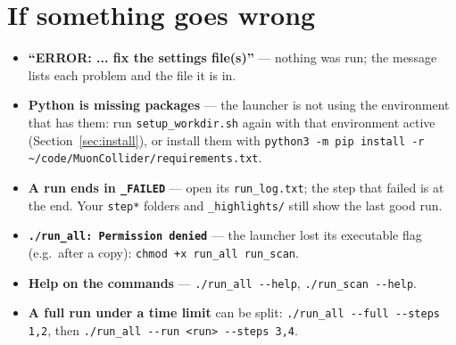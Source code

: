 \documentclass[11pt,letterpaper]{article}
\newcommand{\code}[1]{\texttt{#1}}
\begin{document}
\section{If something goes wrong}
\begin{itemize}[leftmargin=1.2em]
\item \textbf{``ERROR: ... fix the settings file(s)''} --- nothing was run;
  the message lists each problem and the file it is in.
\item \textbf{Python is missing packages} --- the launcher is not using the
  environment that has them: run \code{setup\_workdir.sh} again with that
  environment active (Section~\ref{sec:install}), or install them with
  \code{python3 -m pip install -r \textasciitilde/code/MuonCollider/requirements.txt}.
\item \textbf{A run ends in \code{\_FAILED}} --- open its
  \code{run\_log.txt}; the step that failed is at the end. Your
  \code{step*} folders and \code{\_highlights/} still show the last good run.
\item \textbf{\code{./run\_all: Permission denied}} --- the launcher lost
  its executable flag (e.g.\ after a copy): \code{chmod +x run\_all run\_scan}.
\item \textbf{Help on the commands} --- \code{./run\_all -{}-help},
  \code{./run\_scan -{}-help}.
\item \textbf{A full run under a time limit} can be split:
  \code{./run\_all -{}-full -{}-steps 1,2}, then
  \code{./run\_all -{}-run <run> -{}-steps 3,4}.
\end{itemize}

\end{document}
